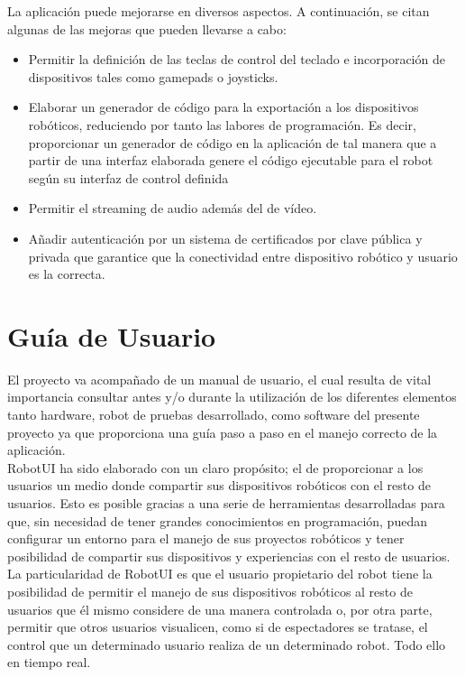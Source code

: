 \documentclass[a4paper,12pt]{article}
\begin{document}
La aplicación puede mejorarse en diversos aspectos. A continuación, se citan algunas de las mejoras que pueden llevarse a cabo:

\begin{itemize}
  \item Permitir la definición de las teclas de control del teclado e incorporación de dispositivos tales como gamepads o joysticks.
  \item Elaborar un generador de código para la exportación a los dispositivos robóticos, reduciendo por tanto las labores de programación. Es decir, proporcionar un generador de código
  en la aplicación de tal manera que a partir de una interfaz elaborada genere el código ejecutable para el robot según su interfaz de control definida\\
  \item Permitir el streaming de audio además del de vídeo.\\
  \item Añadir autenticación por un sistema de certificados por clave pública y privada que garantice que la conectividad entre dispositivo robótico y usuario es la correcta.\\
\end{itemize}

\section{ Guía de Usuario}

El proyecto va acompañado de un manual de usuario, el cual resulta de vital importancia consultar antes y/o durante la utilización de los diferentes elementos tanto hardware, robot de pruebas desarrollado, como software del 
presente proyecto ya que proporciona una guía paso a paso en el manejo correcto de la aplicación.\\

RobotUI ha sido elaborado con un claro propósito; el de  proporcionar a los usuarios un medio donde compartir sus dispositivos robóticos con el resto de usuarios. Esto es posible gracias a una serie de
herramientas desarrolladas para que, sin necesidad de tener grandes conocimientos en programación, puedan configurar un entorno para el manejo de sus proyectos robóticos y tener 
posibilidad de compartir sus dispositivos y experiencias con el resto de usuarios.\\

La particularidad de RobotUI es que el usuario propietario del robot tiene la posibilidad de permitir el manejo de sus dispositivos robóticos al resto de usuarios que él mismo considere de una 
manera controlada o, por otra parte, permitir que otros usuarios visualicen, como si de espectadores se tratase, el control que un determinado usuario realiza de un determinado robot.
Todo ello en tiempo real.\\
\end{document}
